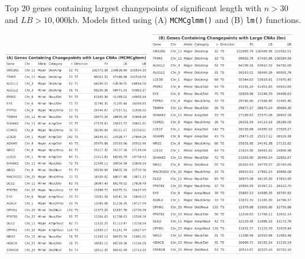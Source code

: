 \vfill
\begin{table}[!h]
\vspace{6cm}
\caption[Top 20 genes containing largest changepoints of significant length with $n > 30$ and $LB > 10,000$kb.]{Top 20 genes containing largest changepoints of significant length with $n > 30$ and $LB > 10,000$kb. Models fitted using (A) \texttt{MCMCglmm()} and (B) \texttt{lm()} functions.}
\centering
\includegraphics[width = 0.48\textwidth, align = c]{../tables/Chapter_6/Gene_MCMC_1_Thesis.png}
\includegraphics[width = 0.48\textwidth]{../tables/Chapter_6/Gene_LM_1_Thesis.png}
\label{tab:TopLength_Genes_1}
\end{table}
\vfill

